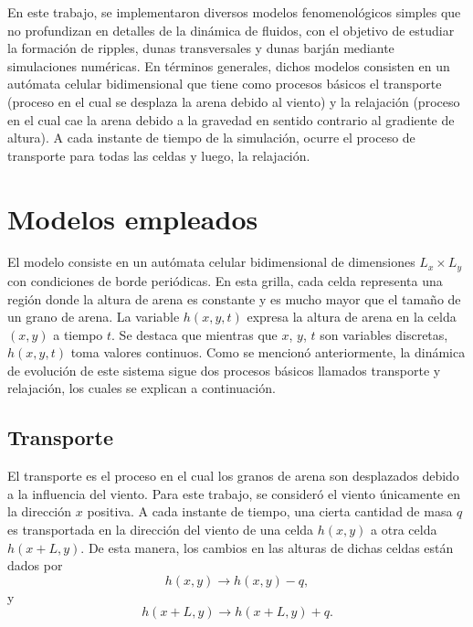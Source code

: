 \documentclass[11pt,twocolumn,twoside]{opticajnl}
\begin{document}
En este trabajo, se implementaron diversos modelos fenomenológicos simples que no profundizan en detalles de la dinámica de fluidos, con el objetivo de estudiar la formación de ripples, dunas transversales y dunas barján mediante simulaciones numéricas. En términos generales, dichos modelos consisten en un autómata celular bidimensional que tiene como procesos básicos el transporte (proceso en el cual se desplaza la arena debido al viento) y la relajación (proceso en el cual cae la arena debido a la gravedad en sentido contrario al gradiente de altura). A cada instante de tiempo de la simulación, ocurre el proceso de transporte para todas las celdas y luego, la relajación. 

\section{Modelos empleados}

El modelo consiste en un autómata celular bidimensional de dimensiones $L_x\times L_y$ con condiciones de borde periódicas. En esta grilla, cada celda representa una región donde la altura de arena es constante y es mucho mayor que el tamaño de un grano de arena. La variable $h(x,y,t)$ expresa la altura de arena en la celda $(x,y)$ a tiempo $t$. Se destaca que mientras que $x$, $y$, $t$ son variables discretas, $h(x,y,t)$ toma valores continuos. Como se mencionó anteriormente, la dinámica de evolución de este sistema sigue dos procesos básicos llamados transporte y relajación, los cuales se explican a continuación. 

\subsection{Transporte}

El transporte es el proceso en el cual los granos de arena son desplazados debido a la influencia del viento. Para este trabajo, se consideró el viento únicamente en la dirección $x$ positiva. A cada instante de tiempo, una cierta cantidad de masa $q$ es transportada en la dirección del viento de una celda $h(x,y)$ a otra celda $h(x + L, y)$. De esta manera, los cambios en las alturas de dichas celdas están dados por
\begin{equation}
    h(x,y) \rightarrow h(x,y) - q,
\end{equation}
y 
\begin{equation}
    h(x+L,y) \rightarrow h(x+L,y) + q.
\end{equation}
\end{document}
